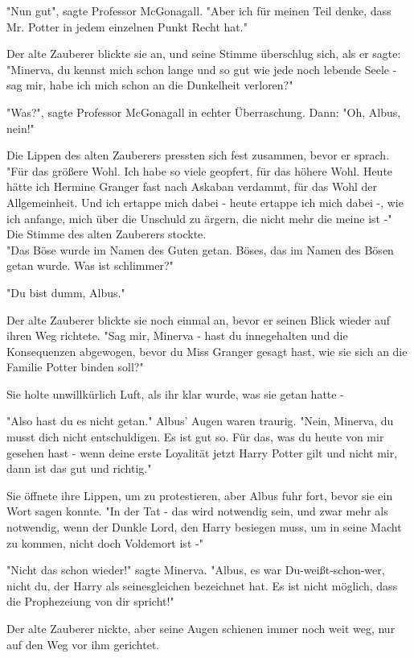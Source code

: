 {"Nun gut", sagte Professor McGonagall. "Aber ich für meinen Teil denke, dass Mr. Potter in jedem einzelnen Punkt Recht hat."

Der alte Zauberer blickte sie an, und seine Stimme überschlug sich, als er sagte: "Minerva, du kennst mich schon lange und so gut wie jede noch lebende Seele - sag mir, habe ich mich schon an die Dunkelheit verloren?"

"Was?", sagte Professor McGonagall in echter Überraschung. Dann: "Oh, Albus, nein!"

Die Lippen des alten Zauberers pressten sich fest zusammen, bevor er sprach.\\ "Für das größere Wohl. Ich habe so viele geopfert, für das höhere Wohl. Heute hätte ich Hermine Granger fast nach Askaban verdammt, für das Wohl der Allgemeinheit. Und ich ertappe mich dabei - heute ertappe ich mich dabei -, wie ich anfange, mich über die Unschuld zu ärgern, die nicht mehr die meine ist -"\\ Die Stimme des alten Zauberers stockte.\\ "Das Böse wurde im Namen des Guten getan. Böses, das im Namen des Bösen getan wurde. Was ist schlimmer?"

"Du bist dumm, Albus."

Der alte Zauberer blickte sie noch einmal an, bevor er seinen Blick wieder auf ihren Weg richtete. "Sag mir, Minerva - hast du innegehalten und die Konsequenzen abgewogen, bevor du Miss Granger gesagt hast, wie sie sich an die Familie Potter binden soll?"

Sie holte unwillkürlich Luft, als ihr klar wurde, was sie getan hatte -

"Also hast du es nicht getan." Albus' Augen waren traurig. "Nein, Minerva, du musst dich nicht entschuldigen. Es ist gut so. Für das, was du heute von mir gesehen hast - wenn deine erste Loyalität jetzt Harry Potter gilt und nicht mir, dann ist das gut und richtig."

Sie öffnete ihre Lippen, um zu protestieren, aber Albus fuhr fort, bevor sie ein Wort sagen konnte. "In der Tat - das wird notwendig sein, und zwar mehr als notwendig, wenn der Dunkle Lord, den Harry besiegen muss, um in seine Macht zu kommen, nicht doch Voldemort ist -"

"Nicht das schon wieder!" sagte Minerva. "Albus, es war Du-weißt-schon-wer, nicht du, der Harry als seinesgleichen bezeichnet hat. Es ist nicht möglich, dass die Prophezeiung von dir spricht!"

Der alte Zauberer nickte, aber seine Augen schienen immer noch weit weg, nur auf den Weg vor ihm gerichtet.

}
